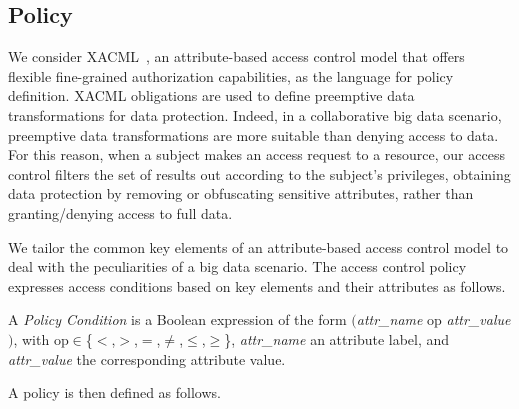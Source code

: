 \subsection{Policy}
We consider XACML~\cite{XACML}, an attribute-based access control model that offers flexible fine-grained authorization capabilities, as the language for policy definition. XACML obligations are used to define preemptive data transformations for data protection.
Indeed, in a collaborative big data scenario, preemptive data transformations are more suitable than denying access to data. For this reason, when a subject makes an access request to a resource, our access control filters the set of results out according to the subject's privileges, obtaining data protection by removing or obfuscating sensitive attributes, rather than granting/denying access to full data.

We tailor the common key elements of an attribute-based access control model to deal with the peculiarities of a big data scenario. The access control policy expresses access conditions based on key elements and their attributes as follows.

\begin{definition}\label{def:policy_cond}
  A \emph{Policy Condition} is a Boolean expression of the form $($\emph{attr\_name} op \emph{attr\_value}$)$, with op$\in$\{$<$,$>$,$=$,$\neq$,$\leq$,$\geq$\}, \emph{attr\_name} an attribute label, and \emph{attr\_value} the corresponding attribute value.
\end{definition}

A policy is then defined as follows.

